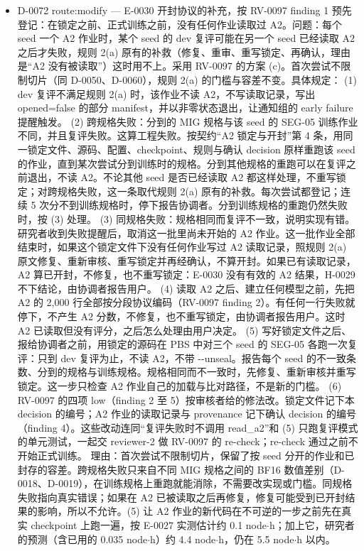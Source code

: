\documentclass[11pt]{article}
\begin{document}
\begin{itemize}
\item D-0072 route:modify --- E-0030 开封协议的补充，按 RV-0097 finding 1 预先登记：在锁定之前、正式训练之前，没有任何作业读取过 A2。问题：每个 seed 一个 A2 作业时，某个 seed 的 dev 复评可能在另一个 seed 已经读取 A2 之后才失败，规则 2(a) 原有的补救（修复、重审、重写锁定、再确认，理由是``A2 没有被读取''）这时用不上。采用 RV-0097 的方案 (c)。首次尝试不限制切片（同 D-0050、D-0060），规则 2(a) 的门槛与容差不变。具体规定： (1) dev 复评不满足规则 2(a) 时，该作业不读 A2，不写读取记录，写出 opened=false 的部分 manifest，并以非零状态退出，让通知组的 early failure 提醒触发。 (2) 跨规格失败：分到的 MIG 规格与该 seed 的 SEG-05 训练作业不同，并且复评失败。这算工程失败。按契约``A2 锁定与开封''第 4 条，用同一锁定文件、源码、配置、checkpoint、规则与确认 decision 原样重跑该 seed 的作业，直到某次尝试分到训练时的规格。分到其他规格的重跑可以在复评之前退出，不读 A2。不论其他 seed 是否已经读取 A2 都这样处理，不重写锁定；对跨规格失败，这一条取代规则 2(a) 原有的补救。每次尝试都登记；连续 5 次分不到训练规格时，停下报告协调者。分到训练规格的重跑仍然失败时，按 (3) 处理。 (3) 同规格失败：规格相同而复评不一致，说明实现有错。研究者收到失败提醒后，取消这一批里尚未开始的 A2 作业。这一批作业全部结束时，如果这个锁定文件下没有任何作业写过 A2 读取记录，照规则 2(a) 原文修复、重新审核、重写锁定并再经确认，不算开封。如果已有读取记录，A2 算已开封，不修复，也不重写锁定：E-0030 没有有效的 A2 结果，H-0029 不下结论，由协调者报告用户。 (4) 读取 A2 之后、建立任何模型之前，先把 A2 的 2,000 行全部按分段协议编码（RV-0097 finding 2）。有任何一行失败就停下，不产生 A2 分数，不修复，也不重写锁定，由协调者报告用户。这时 A2 已读取但没有评分，之后怎么处理由用户决定。 (5) 写好锁定文件之后、报给协调者之前，用锁定的源码在 PBS 中对三个 seed 的 SEG-05 各跑一次复评：只到 dev 复评为止，不读 A2，不带 -{}-unseal。报告每个 seed 的不一致条数、分到的规格与训练规格。规格相同而不一致时，先修复、重新审核并重写锁定。这一步只检查 A2 作业自己的加载与比对路径，不是新的门槛。 (6) RV-0097 的四项 low（finding 2 至 5）按审核者给的修法改。锁定文件记下本 decision 的编号；A2 作业的读取记录与 provenance 记下确认 decision 的编号（finding 4）。这些改动连同``复评失败时不调用 read\_a2''和 (5) 只跑复评模式的单元测试，一起交 reviewer-2 做 RV-0097 的 re-check；re-check 通过之前不开始正式训练。 理由：首次尝试不限制切片，保留了按 seed 分开的作业和已封存的容差。跨规格失败只来自不同 MIG 规格之间的 BF16 数值差别（D-0018、D-0019），在训练规格上重跑就能消除，不需要改实现或门槛。同规格失败指向真实错误；如果在 A2 已被读取之后再修复，修复可能受到已开封结果的影响，所以不允许。(5) 让 A2 作业的新代码在不可逆的一步之前先在真实 checkpoint 上跑一遍，按 E-0027 实测估计约 0.1 node\ensuremath{\cdot}h；加上它，研究者的预测（含已用的 0.035 node\ensuremath{\cdot}h）约 4.4 node\ensuremath{\cdot}h，仍在 5.5 node\ensuremath{\cdot}h 以内。

\end{itemize}
\end{document}
